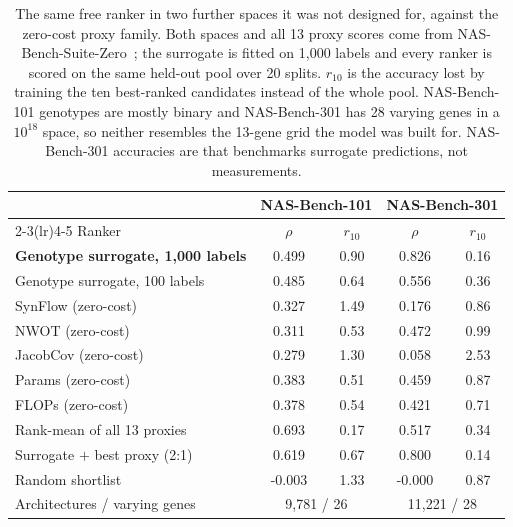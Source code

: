 \begin{table}[t]
\centering
\caption{The same free ranker in two further spaces it was not designed for, against the zero-cost proxy family. Both spaces and all 13 proxy scores come from NAS-Bench-Suite-Zero~\cite{krishnakumar2022nasbenchsuitezero}; the surrogate is fitted on 1{,}000 labels and every ranker is scored on the same held-out pool over 20 splits. $r_{10}$ is the accuracy lost by training the ten best-ranked candidates instead of the whole pool. NAS-Bench-101 genotypes are mostly binary and NAS-Bench-301 has 28 varying genes in a $10^{18}$ space, so neither resembles the 13-gene grid the model was built for. NAS-Bench-301 accuracies are that benchmarks surrogate predictions, not measurements.}
\label{tab:zc_spaces}
\footnotesize
\setlength{\tabcolsep}{4pt}
\begin{tabular}{l cc cc}
\toprule
& \multicolumn{2}{c}{NAS-Bench-101} & \multicolumn{2}{c}{NAS-Bench-301} \\
\cmidrule(lr){2-3}\cmidrule(lr){4-5}
Ranker & $\rho$ & $r_{10}$ & $\rho$ & $r_{10}$ \\
\midrule
\quad \textbf{Genotype surrogate, 1{,}000 labels} & 0.499 & 0.90 & 0.826 & 0.16 \\
\quad Genotype surrogate, 100 labels & 0.485 & 0.64 & 0.556 & 0.36 \\
\addlinespace[1pt]
\quad SynFlow (zero-cost) & 0.327 & 1.49 & 0.176 & 0.86 \\
\quad NWOT (zero-cost) & 0.311 & 0.53 & 0.472 & 0.99 \\
\quad JacobCov (zero-cost) & 0.279 & 1.30 & 0.058 & 2.53 \\
\quad Params (zero-cost) & 0.383 & 0.51 & 0.459 & 0.87 \\
\quad FLOPs (zero-cost) & 0.378 & 0.54 & 0.421 & 0.71 \\
\quad Rank-mean of all 13 proxies & 0.693 & 0.17 & 0.517 & 0.34 \\
\addlinespace[1pt]
\quad Surrogate $+$ best proxy (2:1) & 0.619 & 0.67 & 0.800 & 0.14 \\
\quad Random shortlist & -0.003 & 1.33 & -0.000 & 0.87 \\
\midrule
Architectures / varying genes & \multicolumn{2}{c}{9{,}781 / 26} & \multicolumn{2}{c}{11{,}221 / 28} \\
\bottomrule
\end{tabular}
\end{table}
